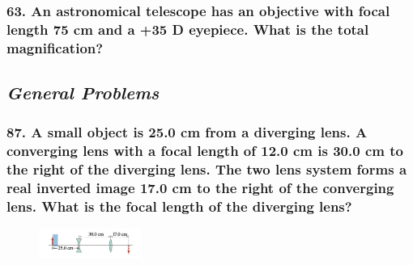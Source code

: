 \documentclass{article}
\begin{document}
\subsubsection*{
    63. An astronomical telescope has an objective with focal length 75 cm and a +35 D eyepiece. What is the
    total magnification?
}
\newpage
\begin{center}
    \subsection*{\textbf{\textit{General Problems}}}
\end{center}
\subsubsection*{
    87. A small object is 25.0 cm from a diverging lens. A converging lens with a focal length of 12.0 cm is
    30.0 cm to the right of the diverging lens. The two lens system forms a real inverted image 17.0 cm to the
    right of the converging lens. What is the focal length of the diverging lens?
}
\begin{figure}[h]
    \begin{center}
        \includegraphics[width=0.3\textwidth]{figures/p87.png}
    \end{center}
\end{figure}
\end{document}
